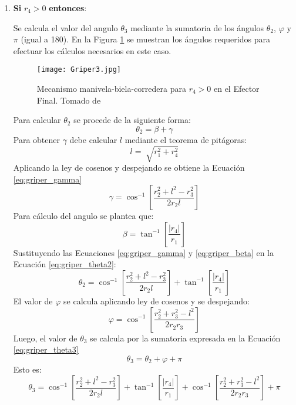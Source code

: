 \begin{enumerate}
\item \textbf{Si} $r_4>0$ \textbf{entonces}:

Se calcula el valor del angulo $\theta_3$ mediante la sumatoria de los ángulos $\theta_2$, $\varphi$ y $\pi$  (igual a 180). En la Figura \ref{fig:Griper_MBC1} se muestran los ángulos requeridos para efectuar los cálculos necesarios en este caso.
\begin{figure}[htb]
    \centering
     \texttt{[image: Griper3.jpg]}
    \caption [Mecanismo manivela-biela-corredera para $r_4 > 0$ en el Efector Final.]{Mecanismo manivela-biela-corredera para $r_4 > 0$ en el Efector Final. Tomado de \cite{zapata_zapata_control_2017} }
    \label{fig:Griper_MBC1}
\end{figure}

Para calcular $\theta_2$ se procede de la siguiente forma:
\begin{equation}
\theta_2=\beta+\gamma
\end{equation}
Para obtener $\gamma$ debe calcular $l$ mediante el teorema de pitágoras:
\begin{equation}
l=\sqrt[]{r^2_1 +r^2_4}
\end{equation}
Aplicando la ley de cosenos y despejando se obtiene la Ecuación \ref{eq:griper_gamma} 
\begin{equation} \label{eq:griper_gamma}
\gamma=\cos^{-1}\left[  \frac{r^2_2 +l^2-r^2_3}{2r_2l}\right]
\end{equation}
Para cálculo  del angulo se plantea que:
\begin{equation}\label{eq:griper_beta} 
\beta=\tan^{-1}\left[  \frac{|r_4|}{r_1}\right]
\end{equation}
Sustituyendo las Ecuaciones \ref{eq:griper_gamma} y \ref{eq:griper_beta} en la Ecuación \ref{eq:griper_theta2}:
\begin{equation}\label{eq:griper_theta2}
\theta_2=  \cos^{-1}\left[  \frac{r^2_2 +l^2-r^2_3}{2r_2l}\right]+ \tan^{-1}\left[  \frac{|r_4|}{r_1}\right]
\end{equation}
El valor de $\varphi$ se calcula aplicando ley de cosenos y se despejando:
\begin{equation}\label{eq:griper_varphi}
\varphi=\cos^{-1}\left[ \frac{r^2_2 +r^2_3-l^2}{2r_2r_3}\right]
\end{equation}
Luego, el valor de $\theta_3$ se calcula por la sumatoria expresada en la Ecuación \ref{eq:griper_theta3}
\begin{equation}\label{eq:griper_theta3}
\theta_3=\theta_2+\varphi+\pi
\end{equation}
Esto es:
\begin{equation}\label{eq:griper_theta32}
\theta_3= \cos^{-1}\left[  \frac{r^2_2 +l^2-r^2_3}{2r_2l}\right]+ \tan^{-1}\left[  \frac{|r_4|}{r_1}\right]+\cos^{-1}\left[ \frac{r^2_2 +r^2_3-l^2}{2r_2r_3}\right]+\pi
\end{equation}


\end{enumerate}
